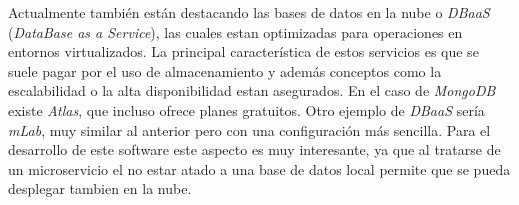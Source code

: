 Actualmente también están destacando las bases de datos en la nube o \textit{DBaaS} (\textit{DataBase as a Service}), las cuales estan optimizadas para operaciones en entornos virtualizados. La principal característica de estos servicios es que se suele pagar por el uso de almacenamiento y además conceptos como la escalabilidad o la alta disponibilidad estan asegurados. En el caso de \textit{MongoDB} existe \textit{Atlas}, que incluso ofrece planes gratuitos. Otro ejemplo de \textit{DBaaS} sería \textit{mLab}, muy similar al anterior pero con una configuración más sencilla. Para el desarrollo de este software este aspecto es muy interesante, ya que al tratarse de un microservicio el no estar atado a una base de datos local permite que se pueda desplegar tambien en la nube.

